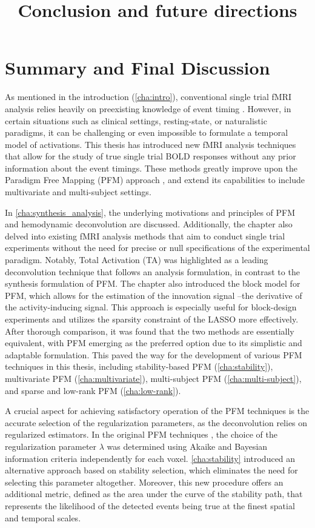 \title{Conclusion and future directions}
\label{cha:conclusion}

\section{Summary and Final Discussion}

As mentioned in the introduction (\cref{cha:intro}), conventional single trial
fMRI analysis relies heavily on preexisting knowledge of event timing
\citep{Buckner1996Detectioncorticalactivation,Menon1998Mentalchronometryusing,Richter1997TimeresolvedfMRI}.
However, in certain situations such as clinical settings, resting-state, or
naturalistic paradigms, it can be challenging or even impossible to formulate a
temporal model of activations. This thesis has introduced new fMRI analysis
techniques that allow for the study of true single trial BOLD responses without
any prior information about the event timings. These methods greatly improve
upon the Paradigm Free Mapping (PFM) approach \citep{Gaudes2013Paradigmfreemapping}, and
extend its capabilities to include multivariate and multi-subject settings.

In \cref{cha:synthesis_analysis}, the underlying motivations and principles of
PFM and hemodynamic deconvolution are discussed. Additionally, the chapter also
delved into existing fMRI analysis methods that aim to conduct single trial
experiments without the need for precise or null specifications of the
experimental paradigm. Notably, Total Activation (TA) was highlighted as a leading
deconvolution technique that follows an analysis formulation, in contrast to the
synthesis formulation of PFM. The chapter also introduced the block model for
PFM, which allows for the estimation of the innovation signal --the derivative
of the activity-inducing signal. This approach is especially useful for
block-design experiments and utilizes the sparsity constraint of the LASSO more
effectively. After thorough comparison, it was found that the two methods are
essentially equivalent, with PFM emerging as the preferred option due to its
simplistic and adaptable formulation. This paved the way for the development of
various PFM techniques in this thesis, including stability-based PFM
(\cref{cha:stability}), multivariate PFM (\cref{cha:multivariate}),
multi-subject PFM (\cref{cha:multi-subject}), and sparse and low-rank PFM
(\cref{cha:low-rank}).

A crucial aspect for achieving satisfactory operation of the PFM techniques is
the accurate selection of the regularization parameters, as the deconvolution
relies on regularized estimators. In the original PFM techniques
\citep{Gaudes2013Paradigmfreemapping}, the choice of the regularization
parameter $\lambda$ was determined using Akaike and Bayesian information
criteria independently for each voxel. \cref{cha:stability} introduced an
alternative approach based on stability selection, which eliminates the need for
selecting this parameter altogether. Moreover, this new procedure offers an
additional metric, defined as the area under the curve of the stability path,
that represents the likelihood of the detected events being true at the finest
spatial and temporal scales.

